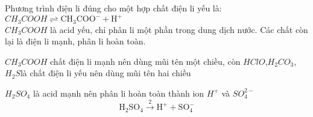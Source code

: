 \def\writeANS{\faKey\protect \, \TLdung{A}\TLsai{B}\TLdung{C}\TLsai{D}}
\def\writeANS{\faKey\protect \, \protect \circlenum {D}}
\begin{loigiaiex}{57}
 Phương trình điện li đúng cho một hợp chất điện li yếu là: $CH_3COOH \rightleftharpoons \text {CH}_3\text {COO}^- + \text {H}^+$ \\ $CH_3COOH$ là acid yếu, chỉ phân li một phần trong dung dịch nước. Các chất còn lại là điện li mạnh, phân li hoàn toàn.
\end{loigiaiex}
\def\writeANS{\faKey\protect \, \TLdung{A}\TLsai{B}\TLdung{C}\TLsai{D}}
\def\writeANS{\faKey\protect \, \protect \circlenum {A}}
\begin{loigiaiex}{58}
  $CH_3COOH$ chất điện li mạnh nên dùng mũi tên một chiều, còn $HClO$,$H_2CO_3$, $H_2S$là chất điện li yếu nên dùng mũi tên hai chiều
\end{loigiaiex}
\def\writeANS{\faKey\protect \, \TLdung{A}\TLsai{B}\TLdung{C}\TLsai{D}}
\def\writeANS{\faKey\protect \, \protect \circlenum {D}}
\begin{loigiaiex}{59}
  $H_2SO_4$ là acid mạnh nên phân li hoàn toàn thành ion $H^+$ và $SO_4^{2-}$ \[\mathrm {H}_2\mathrm {SO}_4 \xrightarrow 2\mathrm {H}^+ + \mathrm {SO}_4^{-}\]
\end{loigiaiex}
